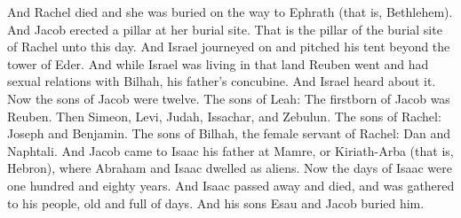 \begin{biblechapter}
\verse And Rachel died and she was buried on the way to Ephrath (that is, Bethlehem).
\verse And Jacob erected a pillar at her burial site. That is the pillar of the burial site of Rachel unto this day.
\verse And Israel journeyed on and pitched his tent beyond the tower of Eder.
\verse And while Israel was living in that land Reuben went and had sexual relations with Bilhah, his father’s concubine. And Israel heard about it.
 Now the sons of Jacob were twelve.
\verse The sons of Leah: The firstborn of Jacob was Reuben. Then Simeon, Levi, Judah, Issachar, and Zebulun.
\verse The sons of Rachel: Joseph and Benjamin.
\verse The sons of Bilhah, the female servant of Rachel: Dan and Naphtali.
 And Jacob came to Isaac his father at Mamre, or Kiriath-Arba (that is, Hebron), where Abraham and Isaac dwelled as aliens.
\verse Now the days of Isaac were one hundred and eighty years.
\verse And Isaac passed away and died, and was gathered to his people, old and full of days. And his sons Esau and Jacob buried him.
\end{biblechapter}


